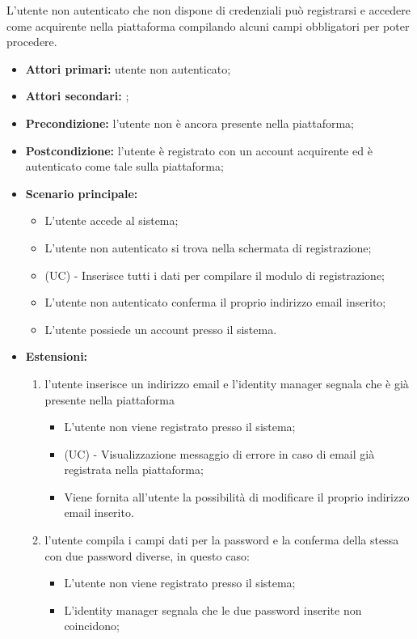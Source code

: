 L'utente non autenticato che non dispone di credenziali può registrarsi e accedere come acquirente nella piattaforma compilando alcuni campi obbligatori per poter procedere.
\begin{itemize}
	\item \textbf{Attori primari:} utente non autenticato;
	\item \textbf{Attori secondari:} ;
	\item \textbf{Precondizione:} l'utente non è ancora presente nella piattaforma;
	\item \textbf{Postcondizione:} l'utente è registrato con un account acquirente ed è autenticato come tale sulla piattaforma;
	\item \textbf{Scenario principale:}
	\begin{itemize}
		\item L'utente accede al sistema;
		\item L'utente non autenticato si trova nella schermata di registrazione;
		\item (UC) - Inserisce tutti i dati per compilare il modulo di registrazione;
		\item L'utente non autenticato conferma il proprio indirizzo email inserito;
		\item L'utente possiede un account presso il sistema.
	\end{itemize}
	\item \textbf{Estensioni:}
	\begin{enumerate}
		\item l'utente inserisce un indirizzo email e l'identity manager segnala che è già presente nella piattaforma
		\begin{itemize}
			\item L'utente non viene registrato presso il sistema;
			\item (UC) - Visualizzazione messaggio di errore in caso di email già registrata nella piattaforma;
			\item Viene fornita all'utente la possibilità di modificare il proprio indirizzo email inserito.
		\end{itemize}
		\item l'utente compila i campi dati per la password e la conferma della stessa con due password diverse, in questo caso:
		\begin{itemize}
			\item L'utente non viene registrato presso il sistema;
			\item L'identity manager segnala che le due password inserite non coincidono;

\end{itemize}
\end{enumerate}
\end{itemize}
